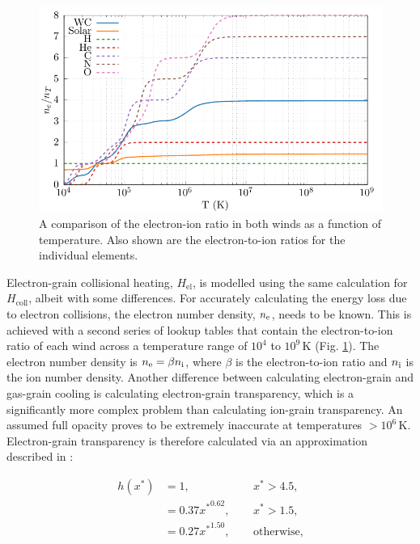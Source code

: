 \begin{figure}
  \centering
  \includegraphics{assets/ionisation-fraction/ionisation-fraction.pdf}
  \caption[OB and WR electron-ion ratios]{A comparison of the electron-ion ratio in both winds as a function of temperature. Also shown are the electron-to-ion ratios for the individual elements.}
  \label{fig:electron-curve}
\end{figure}

Electron-grain collisional heating, $H_\text{el}$, is modelled using the same calculation for $H_\text{coll}$, albeit with some differences.
For accurately calculating the energy loss due to electron collisions, the electron number density, $n_\text{e}$, needs to be known.
This is achieved with a second series of lookup tables that contain the electron-to-ion ratio of each wind across a temperature range of $10^4$ to $10^9\,\si{\kelvin}$ (Fig. \ref{fig:electron-curve}).
The electron number density is $n _\text{e} = \beta n _\text{i}$, where $\beta$ is the electron-to-ion ratio and $n _\text{i}$ is the ion number density.
Another difference between calculating electron-grain and gas-grain cooling is calculating electron-grain transparency, which is a significantly more complex problem than calculating ion-grain transparency.
An assumed full opacity proves to be extremely inaccurate at temperatures $>10^6\,\si{\kelvin}$.
Electron-grain transparency is therefore calculated via an approximation described in \textcite{dwek_infrared_1981}:

\begin{equation}
  \begin{alignedat}{3}
    h(x^*) & = 1 ,                && ~~ x^* > 4.5, \\
           & = 0.37{x^*}^{0.62} , && ~~ x^* > 1.5 , \\
           & = 0.27{x^*}^{1.50} , && ~~ \text{otherwise,}
  \end{alignedat}
\end{equation}

